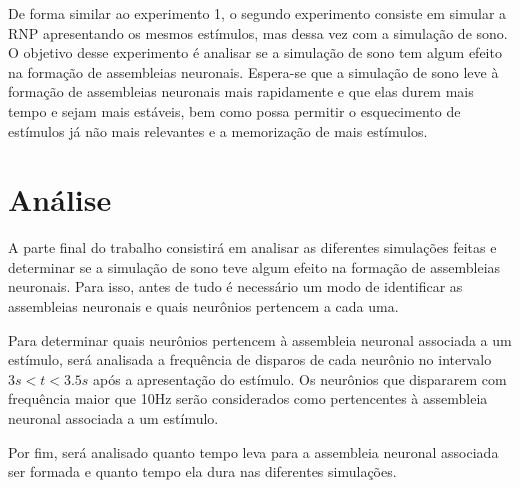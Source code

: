 De forma similar ao experimento 1, o segundo experimento consiste em simular a RNP apresentando os mesmos estímulos, mas dessa vez
com a simulação de sono. O objetivo desse experimento é analisar se a simulação de sono tem algum efeito na formação de
assembleias neuronais. Espera-se que a simulação de sono leve à formação de assembleias neuronais mais rapidamente e que elas
durem mais tempo e sejam mais estáveis, bem como possa permitir o esquecimento de estímulos já não mais relevantes e a memorização
de mais estímulos.

\section{Análise}

A parte final do trabalho consistirá em analisar as diferentes simulações feitas e determinar se a simulação de sono teve algum
efeito na formação de assembleias neuronais. Para isso, antes de tudo é necessário um modo de identificar as assembleias neuronais
e quais neurônios pertencem a cada uma.

Para determinar quais neurônios pertencem à assembleia neuronal associada a um estímulo, será analisada a frequência de disparos de
cada neurônio no intervalo $3s < t < 3.5s$ após a apresentação do estímulo. Os neurônios que dispararem com frequência maior que
10Hz serão considerados como pertencentes à assembleia neuronal associada a um estímulo.

Por fim, será analisado quanto tempo leva para a assembleia neuronal associada ser formada e quanto tempo ela dura nas diferentes
simulações.
